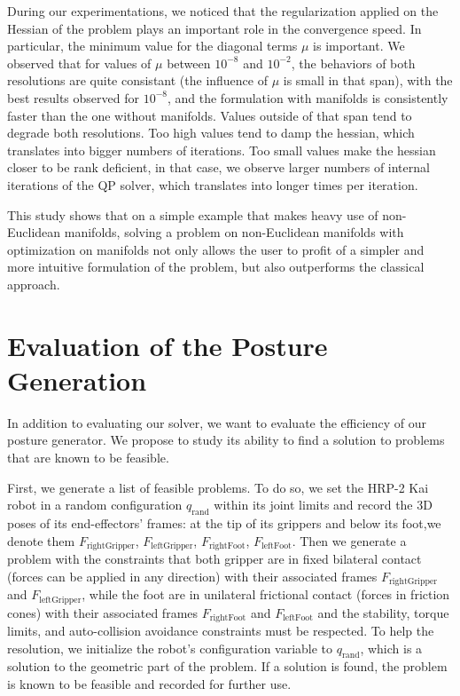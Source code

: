 During our experimentations, we noticed that the regularization applied on the Hessian of the problem plays an important role in the convergence speed.
In particular, the minimum value for the diagonal terms $\mu$ is important.
We observed that for values of $\mu$ between $10^{-8}$ and $10^{-2}$, the behaviors of both resolutions are quite consistant (the influence of $\mu$ is small in that span), with the best results observed for $10^{-8}$, and the formulation with manifolds is consistently faster than the one without manifolds.
Values outside of that span tend to degrade both resolutions.
Too high values tend to damp the hessian, which translates into bigger numbers of iterations.
Too small values make the hessian closer to be rank deficient, in that case, we observe larger numbers of internal iterations of the QP solver, which translates into longer times per iteration.

This study shows that on a simple example that makes heavy use of non-Euclidean manifolds, solving a problem on non-Euclidean manifolds with optimization on manifolds not only allows the user to profit of a simpler and more intuitive formulation of the problem, but also outperforms the classical approach.


\section{Evaluation of the Posture Generation}
\label{sec:evaluation_of_the_posture_generation}

In addition to evaluating our solver, we want to evaluate the efficiency of our posture generator.
We propose to study its ability to find a solution to problems that are known to be feasible.

First, we generate a list of feasible problems.
To do so, we set the HRP-2 Kai robot in a random configuration $q_\text{rand}$ within its joint limits and record the 3D poses of its end-effectors' frames: at the tip of its grippers and below its foot,we denote them $F_\text{rightGripper}$, $F_\text{leftGripper}$, $F_\text{rightFoot}$, $F_\text{leftFoot}$.
Then we generate a problem with the constraints that both gripper are in fixed bilateral contact (forces can be applied in any direction) with their associated frames $F_\text{rightGripper}$ and $F_\text{leftGripper}$, while the foot are in unilateral frictional contact (forces in friction cones) with their associated frames $F_\text{rightFoot}$ and $F_\text{leftFoot}$ and the stability, torque limits, and auto-collision avoidance constraints must be respected.
To help the resolution, we initialize the robot's configuration variable to $q_\text{rand}$, which is a solution to the geometric part of the problem.
If a solution is found, the problem is known to be feasible and recorded for further use.

